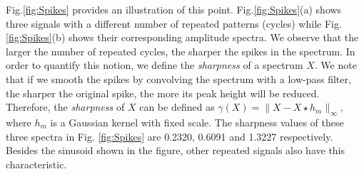 \documentclass[10pt,journal,cspaper,compsoc]{IEEEtran}
\begin{document}
Fig.\ref{fig:Spikes} provides an illustration of this point. Fig.\ref{fig:Spikes}(a) shows three signals with a different number of repeated patterns (cycles) while Fig.\ref{fig:Spikes}(b) shows their corresponding amplitude spectra. We observe that the larger the number of repeated cycles, the sharper the spikes in the spectrum. In order to quantify this notion, we define the {\it sharpness} of a spectrum $X$. We note that if we smooth the spikes by convolving the spectrum with a low-pass filter, the sharper the original spike, the more its peak height will be reduced. Therefore, the {\it sharpness} of $X$ can be defined as
${\mathcal \gamma}(X)= \parallel X-X{\star}h_{m}\parallel_\infty,$
where $h_{m}$ is a Gaussian kernel with fixed scale. The sharpness values of these three spectra in Fig. \ref{fig:Spikes} are 0.2320, 0.6091 and 1.3227 respectively.
Besides the sinusoid shown in the figure, other repeated signals also have this characteristic.
\end{document}
